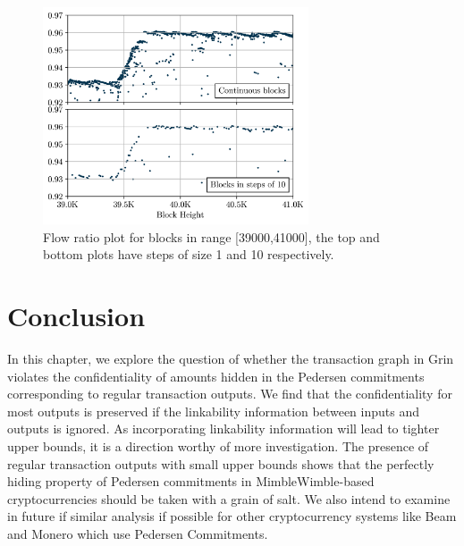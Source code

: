\begin{figure}[!h]
    \centering
    \includegraphics[width=0.7\textwidth]{Figures/continuity_vs_steps.png}
    \caption{Flow ratio plot for blocks in range [39000,41000], the top and bottom plots have steps of size 1 and 10 respectively.}
    \label{continuity-plot}
\end{figure}
  







\section{Conclusion}
In this chapter, we explore the question of whether the transaction graph in Grin violates the confidentiality of amounts hidden in the Pedersen commitments corresponding to regular transaction outputs. We find that the confidentiality for most outputs is preserved if the linkability information between inputs and outputs is ignored. As incorporating linkability information will lead to tighter upper bounds, it is a direction worthy of more investigation. The presence of regular transaction outputs with small upper bounds shows that the perfectly hiding property of Pedersen commitments in MimbleWimble-based cryptocurrencies should be taken with a grain of salt.  
We also intend to examine in future if similar analysis if possible for other cryptocurrency systems like Beam and Monero which use Pedersen Commitments.


